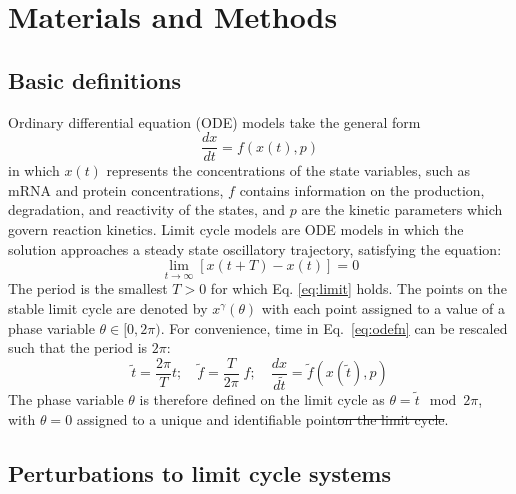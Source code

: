 \documentclass[11pt, letterpaper]{article}
\providecommand{\DIFdel}[1]{{\protect\color{red}\sout{#1}}}                      %
\providecommand{\DIFaddbegin}{} %
\providecommand{\DIFaddend}{} %
\providecommand{\DIFdelbegin}{} %
\providecommand{\DIFdelend}{} %
\begin{document}
\DIFaddbegin 

\DIFaddend \section*{Materials and Methods}

\subsection*{Basic definitions}

Ordinary differential equation (ODE) models take the general form
\begin{equation}
  \frac{dx}{dt} = f(x(t), p)
  \label{eq:odefn}
\end{equation}
in which $x(t)$ represents the concentrations of the state variables, such as
mRNA and protein concentrations, $f$ contains information on the production,
degradation, and reactivity of the states, and $p$ are the kinetic parameters
which govern reaction kinetics. Limit cycle models are ODE models in which the
solution approaches a steady state oscillatory trajectory, satisfying the
equation:
\begin{equation}
  \lim_{t \to \infty} \left[ x(t + T) - x(t) \right] = 0
  \label{eq:limit}
\end{equation}
The period is the smallest $T > 0$ for which Eq. \ref{eq:limit} holds. The
points on the stable limit cycle are denoted by $x^\gamma(\theta)$ with each
point assigned to a value of a phase variable $\theta \in [0, 2\pi)$. For
convenience, time in Eq.~\ref{eq:odefn} can be rescaled such that the period
is $2\pi$:
\begin{equation}
  \tilde{t} = \frac{2\pi}{T}t; \quad \tilde{f} = \frac{T}{2\pi}\;f; \quad
  \frac{dx}{d\tilde{t}} = \tilde{f}(x(\tilde{t}), p)
  \label{eq:that}
\end{equation}
The phase variable $\theta$ is therefore defined on the limit cycle as $\theta =
\tilde{t}\mod 2\pi$, with $\theta = 0$ assigned to a unique and identifiable
point\DIFdelbegin \DIFdel{on the limit cycle}\DIFdelend .

\subsection*{Perturbations to limit cycle systems}
\end{document}
